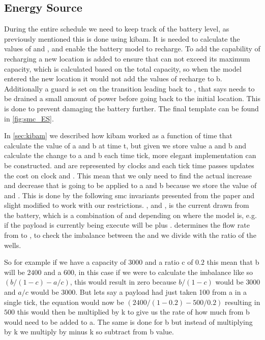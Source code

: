 \subsection{Energy Source} \label{subsec:energy_src}
During the entire schedule we need to keep track of the battery level, as previously mentioned this is done using \gls{kibam}. It is needed to calculate the values of  and , and enable the battery model to recharge\cite{battery_aware_scheduling}. To add the capability of recharging a new location is added to ensure that  can not exceed its maximum capacity, which is calculated based on the total capacity, so when the model entered the new location it would not add the values of recharge to b. Additionally a guard is set on the transition leading back to , that says  needs to be drained a small amount of power before going back to the initial location. This is done to prevent damaging the battery further. The final template can be found in \cref{fig:smc_ES}.

In \cref{sec:kibam} we described how \gls{kibam} worked as a function of time that calculate the value of a and b at time t, but given we store value a and b and calculate the change to a and b each time tick, more elegant implementation can be constructed\cite{battery_aware_scheduling}. 
 and  are represented by clocks and each tick time passes updates the cost on clock  and . This mean that we only need to find the actual increase and decrease that is going to be applied to a and b because we store the value of  and . This is done by the following \gls{smc} invariants presented from the paper and slight modified to work with our restrictions. , and ,  is the current drawn from the battery, which is a combination of  and  depending on where the model is, e.g. if the payload is currently being execute  will be  plus .  determines the flow rate from  to , to check the imbalance between the  and  we divide with the ratio of the wells. 

So for example if we have a capacity of $3000$ and a ratio c of $0.2$ this mean that b will be $2400$ and a $600$, in this case if we were to calculate the imbalance like so $(b/(1-c)-a/c)$, this would result in zero because $b/(1-c)$ would be $3000$ and $a/c$ would be $3000$. But lets say a payload had just taken 100 from a in a single tick, the equation would now be $(2400/(1-0.2)-500/0.2)$ resulting in $500$ this would then be multiplied by k to give us the rate of how much from b would need to be added to a. The same is done for b but instead of multiplying by k we multiply by minus k so subtract from b value.

